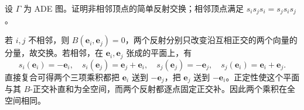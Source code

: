 \begin{optionalexercise}\label{b5:ex:10-reflection-relations}
	设 \(\Gamma\) 为 ADE 图。证明非相邻顶点的简单反射交换；相邻顶点满足 \(s_is_js_i=s_js_is_j\)。
\end{optionalexercise}
\begin{solution}
	若 \(i,j\) 不相邻，则 \(B(\mathbf e_i,\mathbf e_j)=0\)，两个反射分别只改变沿互相正交的两个向量的分量，故交换。若相邻，在 \(\mathbf e_i,\mathbf e_j\) 张成的平面上，有
	\[
		s_i(\mathbf e_i)=-\mathbf e_i,\quad s_i(\mathbf e_j)=\mathbf e_j+\mathbf e_i,\quad s_j(\mathbf e_j)=-\mathbf e_j,\quad s_j(\mathbf e_i)=\mathbf e_i+\mathbf e_j.
	\]
	直接复合可得两个三项乘积都把 \(\mathbf e_i\) 送到 \(-\mathbf e_j\)，把 \(\mathbf e_j\) 送到 \(-\mathbf e_i\)。正定性使这个平面与其 \(B\)-正交补直和为全空间，而两个反射都逐点固定正交补。因此两个乘积在全空间相同。
\end{solution}

